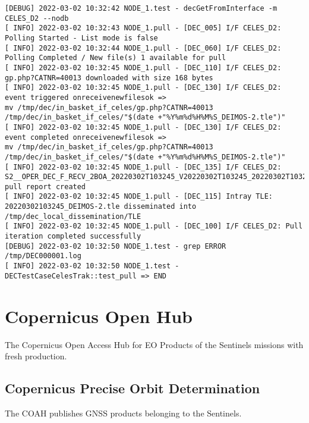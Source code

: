 \documentclass[dec_sum_main.tex]{subfiles}
\begin{document}
\begin{Verbatim}[fontsize=\tiny]
[DEBUG] 2022-03-02 10:32:42 NODE_1.test - decGetFromInterface -m CELES_D2 --nodb
[ INFO] 2022-03-02 10:32:43 NODE_1.pull - [DEC_005] I/F CELES_D2: Polling Started - List mode is false
[ INFO] 2022-03-02 10:32:44 NODE_1.pull - [DEC_060] I/F CELES_D2: Polling Completed / New file(s) 1 available for pull
[ INFO] 2022-03-02 10:32:45 NODE_1.pull - [DEC_110] I/F CELES_D2: gp.php?CATNR=40013 downloaded with size 168 bytes
[ INFO] 2022-03-02 10:32:45 NODE_1.pull - [DEC_130] I/F CELES_D2: event triggered onreceivenewfilesok => 
mv /tmp/dec/in_basket_if_celes/gp.php?CATNR=40013 /tmp/dec/in_basket_if_celes/"$(date +"%Y%m%d%H%M%S_DEIMOS-2.tle")"
[ INFO] 2022-03-02 10:32:45 NODE_1.pull - [DEC_130] I/F CELES_D2: event completed onreceivenewfilesok => 
mv /tmp/dec/in_basket_if_celes/gp.php?CATNR=40013 /tmp/dec/in_basket_if_celes/"$(date +"%Y%m%d%H%M%S_DEIMOS-2.tle")"
[ INFO] 2022-03-02 10:32:45 NODE_1.pull - [DEC_135] I/F CELES_D2: S2__OPER_DEC_F_RECV_2BOA_20220302T103245_V20220302T103245_20220302T103245_CELES_D2.xml pull report created
[ INFO] 2022-03-02 10:32:45 NODE_1.pull - [DEC_115] Intray TLE: 20220302103245_DEIMOS-2.tle disseminated into /tmp/dec_local_dissemination/TLE
[ INFO] 2022-03-02 10:32:45 NODE_1.pull - [DEC_100] I/F CELES_D2: Pull iteration completed successfully
[DEBUG] 2022-03-02 10:32:50 NODE_1.test - grep ERROR /tmp/DEC000001.log
[ INFO] 2022-03-02 10:32:50 NODE_1.test - DECTestCaseCelesTrak::test_pull => END
\end{Verbatim}


\pagebreak


\section{Copernicus Open Hub}

The Copernicus Open Access Hub for EO Products of the Sentinels missions with  fresh production. 

\subsection{Copernicus Precise Orbit Determination}
The COAH publishes GNSS products belonging to the Sentinels.
\end{document}
